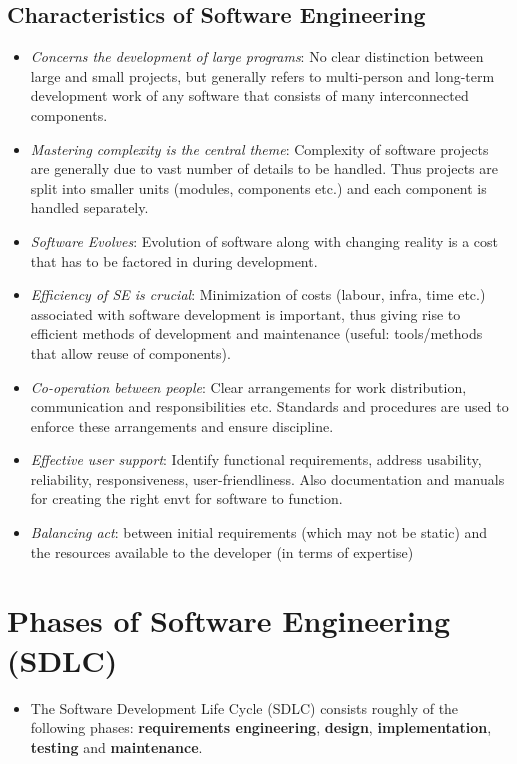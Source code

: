 \documentclass{article}
\begin{document}
\subsection{Characteristics of Software Engineering}
\begin{itemize}
    \item \textit{Concerns the development of large programs}: No clear distinction between large and small projects, but generally refers to multi-person and long-term development work of any software that consists of many interconnected components. 
    
    \item \textit{Mastering complexity is the central theme}: Complexity of software projects are generally due to vast number of details to be handled. Thus projects are split into smaller units (modules, components etc.) and each component is handled separately. 
    
    \item \textit{Software Evolves}: Evolution of software along with changing reality is a cost that has to be factored in during development. 
    
    \item \textit{Efficiency of SE is crucial}: Minimization of costs (labour, infra,  time etc.) associated with software development is important, thus giving rise to efficient methods of development and maintenance (useful: tools/methods that allow reuse of components). 
    
    \item \textit{Co-operation between people}: Clear arrangements for work distribution, communication and responsibilities etc. Standards and procedures are used to enforce these arrangements and ensure discipline. 
    
    \item \textit{Effective user support}: Identify functional requirements, address usability, reliability, responsiveness, user-friendliness. Also documentation and manuals for creating the right envt for software to function. 
    
    \item \textit{Balancing act}: between initial requirements (which may not be static) and the resources available to the developer (in terms of expertise) 
\end{itemize}

\section{Phases of Software Engineering (SDLC)}
\begin{itemize}
    \item The Software Development Life Cycle (SDLC) consists roughly of the following phases: \textbf{requirements engineering}, \textbf{design}, \textbf{implementation}, \textbf{testing} and \textbf{maintenance}. 
\end{itemize}
\end{document}
